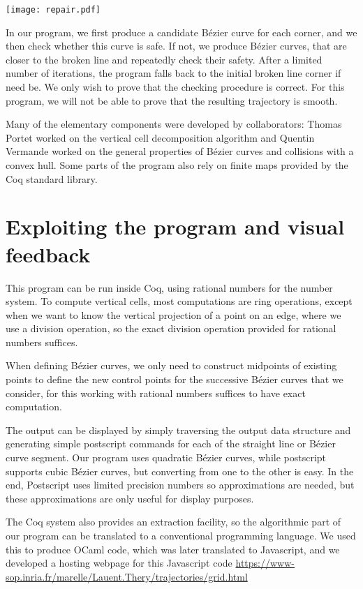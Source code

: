 \documentclass{easychair}
\begin{document}
\begin{center}
\texttt{[image: repair.pdf]}
\end{center}

In our program, we first produce a candidate Bézier curve for each
corner, and we then check whether this curve is safe.  If not, we
produce Bézier curves, that are closer to the broken line and
repeatedly check their safety.  After a limited number of iterations,
the program falls back to the initial broken line corner if need be.
We only wish to prove that the checking procedure is correct.  For
this program, we will not be able to prove that the resulting trajectory
is smooth.

Many of the elementary components were developed by collaborators:
Thomas Portet worked on the vertical cell decomposition algorithm and
Quentin Vermande worked on the general properties of Bézier curves and
collisions with a convex hull.  Some parts of the program also rely on
finite maps provided by the Coq standard library.

\section{Exploiting the program and visual feedback}
This program can be run inside Coq, using rational numbers for the
number system.  To compute vertical cells, most computations are ring
operations, except when we want to know the vertical projection of a
point on an edge, where we use a division operation, so the exact
division operation provided for rational numbers suffices.

When defining Bézier curves, we only need to construct midpoints of
existing points to define the new control points for the successive
Bézier curves that we consider, for this working with rational numbers
suffices to have exact computation.

The output can be displayed by simply traversing the
output data structure and generating simple postscript commands for
each of the straight line or Bézier curve segment.  Our program uses
quadratic Bézier curves, while postscript supports cubic Bézier
curves, but converting from one to the other is easy.  In the end,
Postscript uses limited precision numbers so approximations are
needed, but these approximations are only useful for display purposes.

The Coq system also provides an extraction facility, so the
algorithmic part of our program can be translated to a conventional
programming language.  We used this to produce OCaml code, which was
later translated to Javascript, and we developed a hosting webpage for
this Javascript code
\url{https://www-sop.inria.fr/marelle/Lauent.Thery/trajectories/grid.html}
\end{document}
